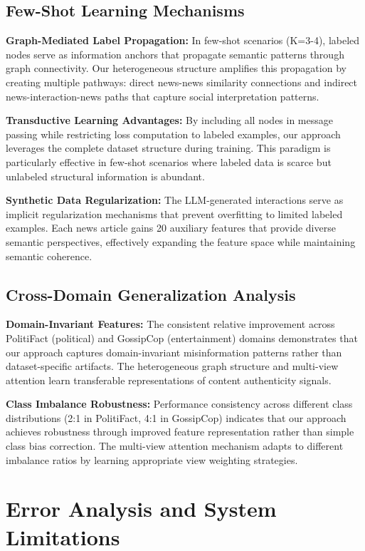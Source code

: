 \subsection{Few-Shot Learning Mechanisms}

\textbf{Graph-Mediated Label Propagation:} In few-shot scenarios (K=3-4), labeled nodes serve as information anchors that propagate semantic patterns through graph connectivity. Our heterogeneous structure amplifies this propagation by creating multiple pathways: direct news-news similarity connections and indirect news-interaction-news paths that capture social interpretation patterns.

\textbf{Transductive Learning Advantages:} By including all nodes in message passing while restricting loss computation to labeled examples, our approach leverages the complete dataset structure during training. This paradigm is particularly effective in few-shot scenarios where labeled data is scarce but unlabeled structural information is abundant.

\textbf{Synthetic Data Regularization:} The LLM-generated interactions serve as implicit regularization mechanisms that prevent overfitting to limited labeled examples. Each news article gains 20 auxiliary features that provide diverse semantic perspectives, effectively expanding the feature space while maintaining semantic coherence.

\subsection{Cross-Domain Generalization Analysis}

\textbf{Domain-Invariant Features:} The consistent relative improvement across PolitiFact (political) and GossipCop (entertainment) domains demonstrates that our approach captures domain-invariant misinformation patterns rather than dataset-specific artifacts. The heterogeneous graph structure and multi-view attention learn transferable representations of content authenticity signals.

\textbf{Class Imbalance Robustness:} Performance consistency across different class distributions (2:1 in PolitiFact, 4:1 in GossipCop) indicates that our approach achieves robustness through improved feature representation rather than simple class bias correction. The multi-view attention mechanism adapts to different imbalance ratios by learning appropriate view weighting strategies.

\section{Error Analysis and System Limitations}

